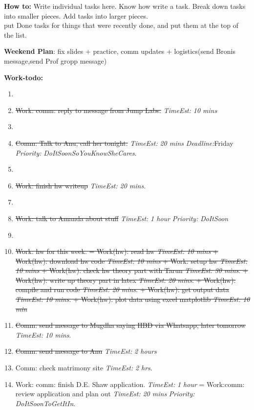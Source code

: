 \documentclass[11pt]{article}
\newcommand{\doneTask}[1]{\item \sout{\small #1}}
\newcommand{\te}[1]{\textit{TimeEst:} \textit{#1}}
\newcommand{\prio}[1]{\textit{Priority:} \textit{#1}}
\newcommand{\dl}[1]{\textit{Deadline:}#1}
\begin{document}
\newpage 
\textbf{How to:} Write individual tasks here. Know how write a task. 
Break down tasks into smaller pieces. Add tasks into larger
pieces. \\ put Done tasks for things that were recently done, and put
them at the top of the list. 



\textbf{Weekend Plan}:  fix slides + practice, comm updates + logistics(send Bronis message,send Prof gropp message)  

\textbf{Work-todo:}\\
\begin{enumerate} 



\item \doneTask{Work: comm: reply to message from Jump Labs.} \te{10
  mins}
\item \doneTask{Comm: Talk to Anu, call her tonight.} \te{20 mins}
  \dl{Friday} \prio{DoItSoonSoYouKnowSheCares}. 

\item \doneTask{Work: finish hw writeup} \te{20 mins}.  

\item \doneTask{Work: talk to Amanda about stuff} \te{1 hour} \prio{DoItSoon} 



\item \doneTask{Work: hw for this week.  =  Work(hw): read hw \te {10 mins} +
  Work(hw): download hw code \te{10 mins}  +  Work: setup hw \te{10
    mins} + Work(hw): check hw theory part with Tarun \te{30 mins}.  
  + Work(hw): write up theory part in latex  \te{20 mins}.
  + Work(hw): compile and run code \te{20 mins}. 
  + Work(hw): get output data \te{10 mins}. 
  + Work(hw): plot data using  excel matplotlib \te{10 min} }

\doneTask{Comm: send message to Mugdha saying HBD via Whatsapp, later
  tomorrow} \te{10 mins}. 
\doneTask{Comm: send message to Anu} \te{2 hours} 

\item Comm: check matrimony site \te{2 hrs}.


\item Work: comm: finish D.E. Shaw application. \te{1 hour} =
  Work:comm: review application and plan out \te{20 mins}
  \prio{DoItSoonToGetItIn}. 


\end{enumerate}
\end{document}
